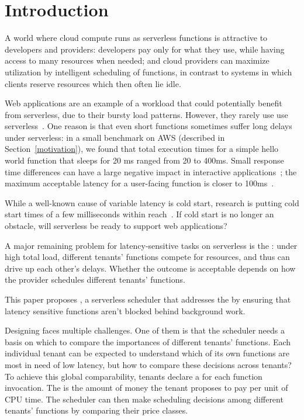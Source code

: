 \section{Introduction}
\label{s:intro}

A world where cloud compute runs as serverless functions is attractive
to developers and providers: developers pay only for what they use,
while having access to many resources when needed; and cloud providers
can maximize utilization by intelligent scheduling of functions, in
contrast to systems in which clients reserve resources which then
often lie idle.

Web applications are an example of a workload that could potentially
benefit from serverless, due to their bursty load patterns. However,
they rarely use use serverless~\cite{reddit-serverless1,
  reddit-serverless2, not-lambda-blog}. One reason is that even short
functions sometimes suffer long delays under serverless: in a small
benchmark on AWS (described in Section~\ref{motivation}), we found that total
execution times for a simple hello world function that sleeps for 20 ms ranged
from 20 to 400ms.
Small response time differences can have a large negative impact in interactive
applications~\cite{amz-page-load,google-page-load}; the maximum acceptable
latency for a user-facing function is closer to 100ms~\cite{page-load-time}.

While a well-known cause of variable latency is cold start, research
is putting cold start times of a few milliseconds within
reach~\cite{sigmaos,mitosis}. If cold start is no longer an obstacle,
will serverless be ready to support web applications?

A major remaining problem for latency-sensitive tasks on serverless
is the \emph{\problem{}}: under high total load, different tenants'
functions compete for resources, and thus can drive up each other's
delays. Whether the outcome is acceptable depends on how the provider
schedules different tenants' functions.

This paper proposes \sys{}, a serverless scheduler that addresses the \problem{}
by ensuring that latency sensitive functions aren't blocked behind background
work.

Designing \sys{} faces multiple challenges. One of them is that the
scheduler needs a basis on which to compare the importances of
different tenants' functions. Each individual tenant can be expected
to understand which of its own functions are most in need of low
latency, but how to compare these decisions across tenants? To achieve
this global comparability, tenants declare a \emph{\priceclass{}} for
each function invocation. The \priceclass{} is the amount of money the
tenant proposes to pay per unit of CPU time. The scheduler can then
make scheduling decisions among different tenants' functions by
comparing their price classes.

